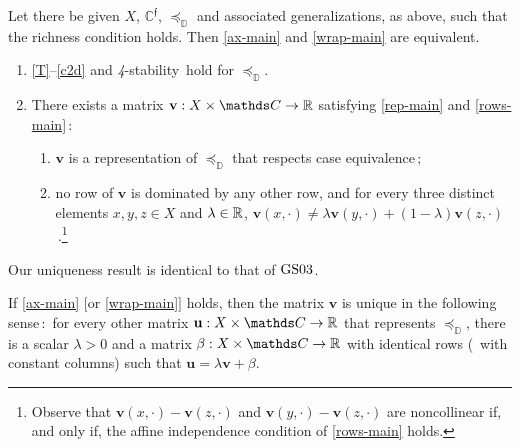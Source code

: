 \documentclass[12pt,a4paper,twoside]{article}
\newcommand{\gsii}{$\textup{GS03}$}
\newcommand{\novel}{\mathfrak f}
\newcommand{\preceqb}{\mathbin{\preceq}}
\newcommand{\mbbd}{{\mathds D}}
\newcommand{\mbbc}{{\mathds C}}
\newcommand{\mbbcp}{{\mathds C^{\novel}}}
\newcommand{\stability}{\textit{4}-\textup{{stability}}}
\newcommand{\Condtwodiv}{\textup{Conditional-\textit{2}-diversity}}
\begin{document}
\begin{theorem}\label{thm-main}
  Let there be given $X$, $\mbbcp$, $\preceqb_ \mbbd$ and
  associated {generalization}s, as above, such that the richness condition holds. Then
  \ref{ax-main} and \ref{wrap-main} are equivalent.
\begin{enumerate}[label=\textup{(\ref{thm-main}.\roman*)}]
\item\label{ax-main}
  \ref{T}--\ref{c2d} and \stability\ hold for $\preceq_{\mbbd}$.
  
\item\label{wrap-main} There exists a matrix
  $\mathbf{v} : X \times \mbbc \rightarrow \R$ satisfying \ref{rep-main} and \ref{rows-main}$\,:$
  \begin{enumerate}[label=\textup{(\ref{thm-main}.\alph*)}]
  \item\label{rep-main} $\mathbf{v}$ is a representation of
    $\preceq_{\mbbd}$ that respects case equivalence$\,;$

  \item\label{rows-main} no row of $\mathbf{v}$ is dominated by
    any other row, and for every three distinct elements $x,y, z \in X$ and
    $\lambda \in \mathbb R$, $\mathbf{v} (x, \cdot) \neq \lambda
    \mathbf{v}(y,\cdot) + (1-\lambda) \mathbf{v}(z,\cdot)$\,.\footnote{Observe that
$\mathbf{v}(x,\cdot)- \mathbf{v}(z,\cdot)$ and
$\mathbf{v}(y,\cdot)-\mathbf{v}(z,\cdot)$ are noncollinear if, and only if,
the affine independence condition of \ref{rows-main} holds.}
\end{enumerate}
\end{enumerate}                 %
\end{theorem}



Our uniqueness result is identical to that of \gsii.  \setcounter{theorem}{0}
\begin{theorem}%
  If \ref{ax-main} $[$or \ref{wrap-main}$]$ holds, then the matrix
  $\mathbf{v}$ is unique in the following sense$\,:$ for every other matrix
  $\mathbf{u} : X \times \mbbc \rightarrow \R$ that represents
  $\preceqb_{\mbbd}$, there is a scalar $\lambda > 0$ and a matrix
  $\beta : X \times \mbbc \rightarrow \R$ with identical rows (\ie\ with
  constant columns) such that $\mathbf{u} = \lambda \mathbf{v} + \beta$.
  
\end{theorem}
\end{document}
